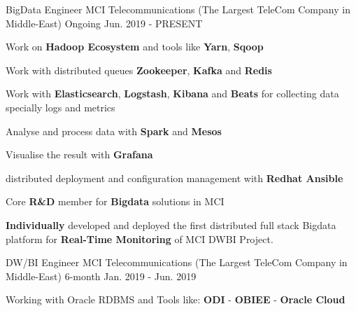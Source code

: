 

\begin{cventries}

  \cventry
    {BigData Engineer} %
    {MCI Telecommunications (The Largest TeleCom Company in Middle-East)} %
    {Ongoing} %
    {Jun. 2019 - PRESENT} %
    {
      \begin{cvitems} %
        \item {Work on \textbf{Hadoop Ecosystem} and tools like \textbf{Yarn}, \textbf{Sqoop}}
        \item {Work with distributed queues \textbf{Zookeeper}, \textbf{Kafka} and \textbf{Redis}}
        \item {Work with \textbf{Elasticsearch}, \textbf{Logstash}, \textbf{Kibana} and \textbf{Beats} for collecting data specially logs and metrics}
        \item {Analyse and process data with \textbf{Spark} and \textbf{Mesos}}
        \item {Visualise the result with \textbf{Grafana}}
        \item {distributed deployment and configuration management with \textbf{Redhat Ansible}}
        \item {Core \textbf{R\&D} member for \textbf{Bigdata} solutions in MCI}
        \item {\textbf{Individually} developed and deployed the first distributed full stack Bigdata platform for \textbf{Real-Time Monitoring} of MCI DWBI Project.}
      \end{cvitems}
    }
  \cventry
    {DW/BI Engineer} %
    {MCI Telecommunications (The Largest TeleCom Company in Middle-East)} %
    {6-month} %
    {Jan. 2019 - Jun. 2019} %
    {
      \begin{cvitems} %
        \item {Working with Oracle RDBMS and Tools like: \textbf{ODI} - \textbf{OBIEE} - \textbf{Oracle Cloud}}

\end{cvitems}}
\end{cventries}
